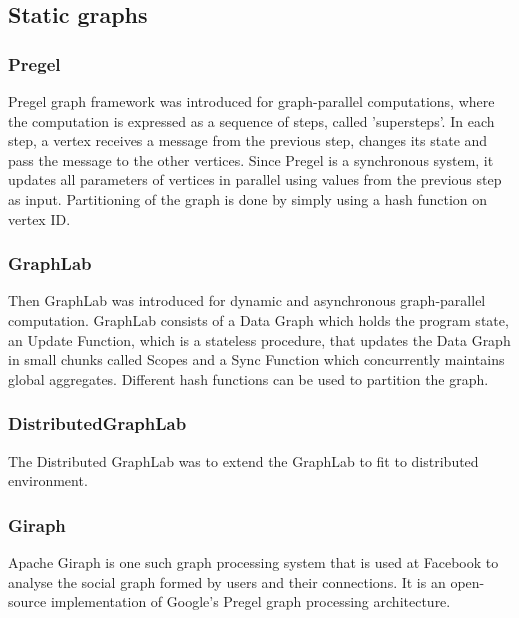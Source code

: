 \documentclass[12pt]{article}
\begin{document}
\subsection{Static graphs}

\subsubsection{Pregel}

Pregel\cite{Pregel} graph framework was introduced for graph-parallel computations, where the computation is expressed as a sequence of steps, called 'supersteps'. In each step, a vertex receives a message from the previous step, changes its state and pass the message to the other vertices. Since Pregel is a synchronous system, it updates all parameters of vertices in parallel using values from the previous step as input. Partitioning of the graph is done by simply using a hash function on vertex ID. 

\subsubsection{GraphLab}

Then GraphLab\cite{Graphlab} \cite{DistributedGraphLab} was introduced for dynamic and asynchronous graph-parallel computation. GraphLab consists of a Data Graph which holds the program state, an Update Function, which is a stateless procedure, that updates the Data Graph in small chunks called Scopes and a Sync Function which concurrently maintains global aggregates. Different hash functions can be used to partition the graph. 

\subsubsection{DistributedGraphLab}

The Distributed GraphLab \cite{DistributedGraphLab} was to extend the GraphLab to fit to distributed environment.  

\subsubsection{Giraph}
Apache Giraph is one such graph processing system that is used at Facebook to analyse the social graph formed by users and their connections. It is an open-source implementation of Google’s Pregel\cite{Pregel} graph processing architecture. 
\end{document}
